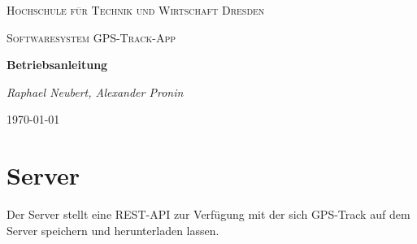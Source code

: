 \documentclass{article}
\begin{document}
\begin{titlepage}
    \centering
    {\scshape\LARGE Hochschule für Technik und Wirtschaft Dresden \par}
    \vspace{1cm}
    {\scshape\Large Softwaresystem \glqq GPS-Track-App\grqq\par}
    \vspace{1.5cm}
    {\huge\bfseries Betriebsanleitung\par}
    \vspace{2cm}
    {\Large\itshape Raphael Neubert, Alexander Pronin \par}
    \vfill

    {\large \today\par}
\end{titlepage}

\tableofcontents
\newpage

\section{Server}
Der Server stellt eine REST-API zur Verfügung mit der sich GPS-Track auf dem Server 
speichern und herunterladen lassen.
\end{document}
